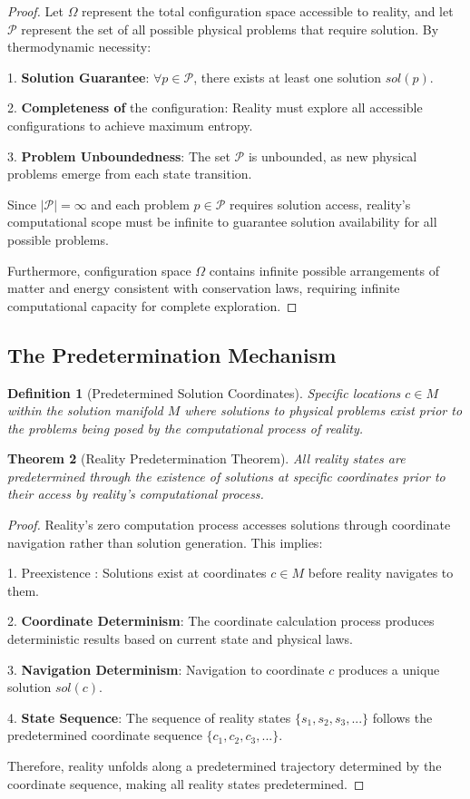 \documentclass[12pt,a4paper]{article}
\newtheorem{theorem}{Theorem}[section]
\newtheorem{definition}[theorem]{Definition}
\begin{document}
\begin{proof}
Let $\Omega$ represent the total configuration space accessible to reality, and let $\mathcal{P}$ represent the set of all possible physical problems that require solution. By thermodynamic necessity:

1. \textbf{Solution Guarantee}: $\forall p \in \mathcal{P}$, there exists at least one solution $sol(p)$.

2. \textbf{Completeness of} the configuration: Reality must explore all accessible configurations to achieve maximum entropy.

3. \textbf{Problem Unboundedness}: The set $\mathcal{P}$ is unbounded, as new physical problems emerge from each state transition.

Since $|\mathcal{P}| = \infty$ and each problem $p \in \mathcal{P}$ requires solution access, reality's computational scope must be infinite to guarantee solution availability for all possible problems.

Furthermore, configuration space $\Omega$ contains infinite possible arrangements of matter and energy consistent with conservation laws, requiring infinite computational capacity for complete exploration.
\end{proof}

\subsection{The Predetermination Mechanism}

\begin{definition}[Predetermined Solution Coordinates]
Specific locations $c \in M$ within the solution manifold $M$ where solutions to physical problems exist prior to the problems being posed by the computational process of reality.
\end{definition}

\begin{theorem}[Reality Predetermination Theorem]
All reality states are predetermined through the existence of solutions at specific coordinates prior to their access by reality's computational process.
\end{theorem}

\begin{proof}
Reality's zero computation process accesses solutions through coordinate navigation rather than solution generation. This implies:

1. Preexistence : Solutions exist at coordinates $c \in M$ before reality navigates to them.

2. \textbf{Coordinate Determinism}: The coordinate calculation process produces deterministic results based on current state and physical laws.

3. \textbf{Navigation Determinism}: Navigation to coordinate $c$ produces a unique solution $sol(c)$.

4. \textbf{State Sequence}: The sequence of reality states $\{s_1, s_2, s_3, ...\}$ follows the predetermined coordinate sequence $\{c_1, c_2, c_3, ...\}$.

Therefore, reality unfolds along a predetermined trajectory determined by the coordinate sequence, making all reality states predetermined.
\end{proof}
\end{document}
